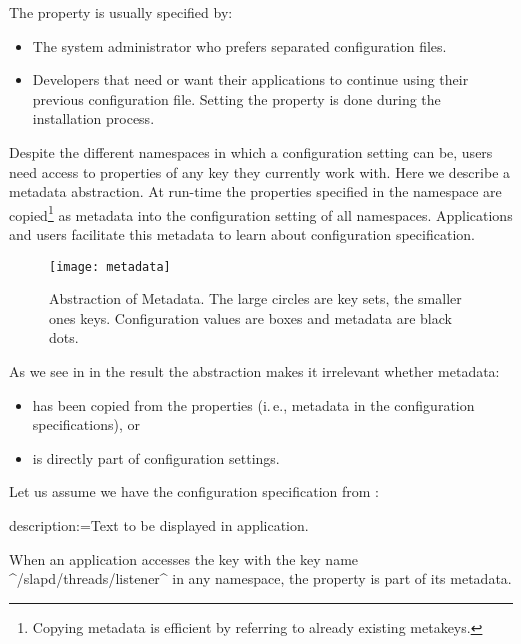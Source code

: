The property  is usually specified by:

\begin{itemize}
\item The system administrator who prefers separated configuration files.
\item Developers that need or want their applications to continue using their previous configuration file.
Setting the property is done during the installation process.
\end{itemize}


Despite the different namespaces in which a configuration setting can be, users need access to properties of any key they currently work with.
Here we describe a metadata abstraction.
At run-time the properties specified in the namespace  are copied\footnote{Copying metadata is efficient by referring to already existing metakeys.} as metadata into the configuration setting of all namespaces.
Applications and users facilitate this metadata to learn about configuration specification.

\begin{figure}[htp]
\centering
\texttt{[image: metadata]}
\caption[Abstraction of Metadata.]{Abstraction of Metadata. The large circles are key sets, the smaller ones keys.
Configuration values are boxes and metadata are black dots.}
\label{fig:metadata}
\end{figure}

As we see in  in the result the abstraction makes it irrelevant whether metadata:
\begin{itemize}
\item has been copied from the properties (i.\,e., metadata in the configuration specifications), or
\item is directly part of configuration settings.
\end{itemize}


\begin{example}
Let us assume we have the configuration specification from :

\begin{code}
  description:=Text to be displayed in application.
\end{code}

When an application accesses the key with the key name ^/slapd/threads/listener^ in any namespace, the property  is part of its metadata.
\end{example}

